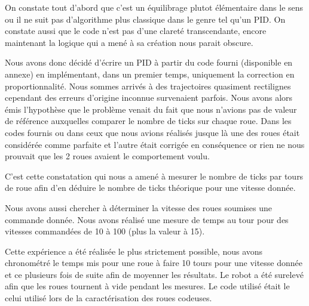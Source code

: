 \documentclass[a4paper]{report}
\begin{document}
On constate tout d'abord que c'est un équilibrage plutot élémentaire dans le sens ou il ne suit pas d'algorithme plus classique dans le genre tel qu'un PID. On constate aussi que le code n'est pas d'une clareté transcendante, encore maintenant la logique qui a mené à sa création nous parait obscure.

Nous avons donc décidé d'écrire un PID à partir du code fourni (disponible en annexe) en implémentant, dans un premier temps, uniquement la correction en proportionnalité. Nous sommes arrivés à des trajectoires quasiment rectilignes cependant des erreurs d'origine inconnue survenaient parfois. Nous avons alors émis l'hypothèse que le problème venait du fait que nous n'avions pas de valeur de référence auxquelles comparer le nombre de ticks sur chaque roue. Dans les codes fournis ou dans ceux que nous avions réalisés jusque là une des roues était considérée comme parfaite et l'autre était corrigée en conséquence or rien ne nous prouvait que les 2 roues avaient le comportement voulu.

C'est cette constatation qui nous a amené à mesurer le nombre de ticks par tours de roue afin d'en déduire le nombre de ticks théorique pour une vitesse donnée.

Nous avons aussi chercher à déterminer la vitesse des roues soumises une commande donnée.
Nous avons réalisé une mesure de temps au tour pour des vitesses commandées de 10 à 100 (plus la valeur à 15).

Cette expérience a été réalisée le plus strictement possible, nous avons chronométré le temps mis pour une roue à faire 10 tours pour une vitesse donnée et ce plusieurs fois de suite afin de moyenner les résultats.
Le robot a été surelevé afin que les roues tournent à vide pendant les mesures.
Le code utilisé était le celui utilisé lors de la caractérisation des roues codeuses.
\end{document}
